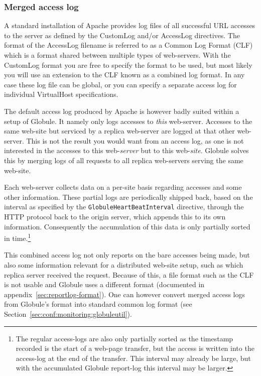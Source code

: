 \documentclass[10pt,a4paper]{article}
\makeatletter
\newenvironment{p}{\@open{P}{}}{\@close{P}}
\newenvironment{p}{}{\par}
\makeatother
\begin{document}
\subsubsection{Merged access log}

\begin{p}
A standard installation of Apache provides log files of all successful URL
accesses to the server as defined by the CustomLog and/or AccessLog
directives.  The format of the AccessLog filename is referred to as a Common
Log Format (CLF) which is a format shared between multiple types of
web-servers.  With the CustomLog format you are free to specify the format to
be used, but most likely you will use an extension to the CLF known as a
combined log format.  In any case these log file can be global, or you can
specify a separate access log for individual VirtualHost specifications.
\end{p}

\begin{p}
The default access log produced by Apache is however badly suited within a
setup of Globule.  It namely only logs accesses to \emph{this} web-server.
Accesses to the same web-site but serviced by a replica web-server are logged
at that other web-server.  This is not the result you would want from an
access log, as one is not interested in the accesses to this web-\emph{server}
but to this web-\emph{site}.
Globule solves this by merging logs of all requests to all replica web-servers
serving the same web-site.
\end{p}

\begin{p}
Each web-server collects data on a per-site basis regarding accesses and
some other information.  These partial logs are periodically shipped back,
based on the interval as specified by the \texttt{GlobuleHeartBeatInterval}
directive, through the HTTP protocol back to the origin server, which appends
this to its own information.  Consequently the accumulation of this data is
only partially sorted in time.\footnote{The regular access-logs are also only
partially sorted as the timestamp recorded is the start of a web-page
transfer, but the access is written into the access-log at the end of the
transfer.  This interval may already be large, but with the accumulated
Globule report-log this interval may be larger.}
\end{p}

\begin{p}
This combined access log not only reports on the bare accesses being made, but
also some information relevant for a distributed web-site setup, such as which
replica server received the request.  Because of this, a file format such as
the CLF is not usable and Globule uses a different format (documented in
appendix~\ref{sec:reportlog-format}).  One can however convert merged access
logs from Globule's format into standard common log format (see
Section~\ref{sec:conf:monitoring:globuleutil}).
\end{p}
\end{document}
